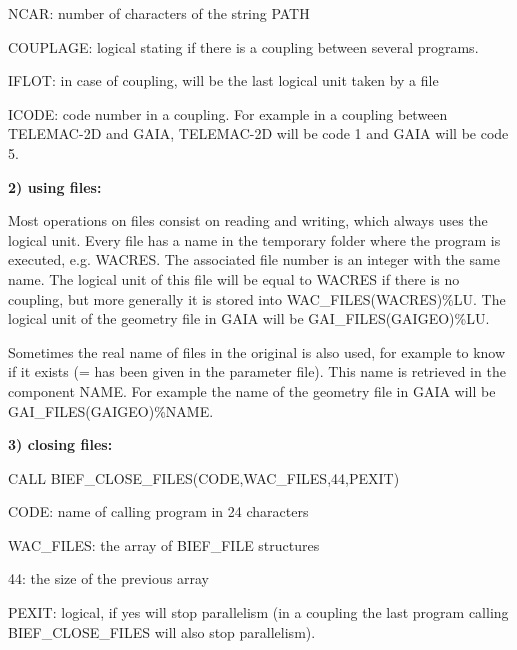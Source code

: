  NCAR: number of characters of the string PATH

 COUPLAGE: logical stating if there is a coupling between several programs.

 IFLOT: in case of coupling, will be the last logical unit taken by a file

 ICODE: code number in a coupling. For example in a coupling between TELEMAC-2D
 and GAIA, TELEMAC-2D will be code 1 and GAIA will be code 5.

 \textbf{2) using files:}

 Most operations on files consist on reading and writing, which always uses the
 logical unit. Every file has a name in the temporary folder where the program
 is executed, e.g. WACRES. The associated file number is an integer with the
 same name. The logical unit of this file will be equal to WACRES if there is
 no coupling, but more generally it is stored into WAC\_FILES(WACRES)\%LU.
 The logical unit of the geometry file in GAIA will be GAI\_FILES(GAIGEO)\%LU.

 Sometimes the real name of files in the original is also used, for example to
 know if it exists (= has been given in the parameter file). This name is
 retrieved in the component NAME. For example the name of the geometry file
 in GAIA will be GAI\_FILES(GAIGEO)\%NAME.

 \textbf{3) closing files:}

 CALL BIEF\_CLOSE\_FILES(CODE,WAC\_FILES,44,PEXIT)

 CODE: name of calling program in 24 characters

 WAC\_FILES: the array of BIEF\_FILE structures

 44: the size of the previous array

 PEXIT: logical, if yes will stop parallelism (in a coupling the last program calling BIEF\_CLOSE\_FILES will also stop parallelism).

